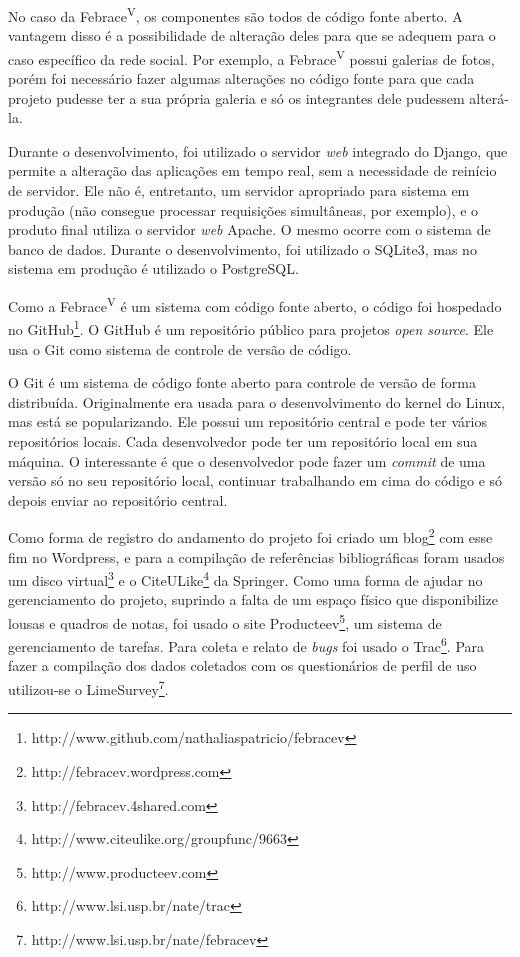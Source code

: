 No caso da Febrace\textsuperscript{V}, os componentes são todos de código fonte aberto. A vantagem disso é a possibilidade de alteração deles para que se adequem para o caso específico da rede social. Por exemplo, a Febrace\textsuperscript{V} possui galerias de fotos, porém foi necessário fazer algumas alterações no código fonte para que cada projeto pudesse ter a sua própria galeria e só os integrantes dele pudessem alterá-la.

Durante o desenvolvimento, foi utilizado o servidor \textit{web} integrado do Django, que permite a alteração das aplicações em tempo real, sem a necessidade de reinício de servidor. Ele não é, entretanto, um servidor apropriado para sistema em produção (não consegue processar requisições simultâneas, por exemplo), e o produto final utiliza o servidor \textit{web} Apache. O mesmo ocorre com o sistema de banco de dados. Durante o desenvolvimento, foi utilizado o SQLite3, mas no sistema em produção é utilizado o PostgreSQL.

Como a Febrace\textsuperscript{V} é um sistema com código fonte aberto, o código foi hospedado no GitHub\footnote{http://www.github.com/nathaliaspatricio/febracev}. O GitHub é um repositório público para projetos \textit{open source}. Ele usa o Git como sistema de controle de versão de código. 

O Git é um sistema de código fonte aberto para controle de versão de forma distribuída. Originalmente era usada para o desenvolvimento do kernel do Linux, mas está se popularizando. Ele possui um repositório central e pode ter vários repositórios locais. Cada desenvolvedor pode ter um repositório local em sua máquina. O interessante é que o desenvolvedor pode fazer um \textit{commit} de uma versão só no seu repositório local, continuar trabalhando em cima do código e só depois enviar ao repositório central.

Como forma de registro do andamento do projeto foi criado um blog\footnote{http://febracev.wordpress.com} com esse fim no Wordpress, e para a compilação de referências bibliográficas foram usados um disco virtual\footnote{http://febracev.4shared.com} e o CiteULike\footnote{http://www.citeulike.org/groupfunc/9663} da Springer. Como uma forma de ajudar no gerenciamento do projeto, suprindo a falta de um espaço físico que disponibilize lousas e quadros de notas, foi usado o site Producteev\footnote{http://www.producteev.com}, um sistema de gerenciamento de tarefas. Para coleta e relato de \textit{bugs} foi usado o Trac\footnote{http://www.lsi.usp.br/nate/trac}. Para fazer a compilação dos dados coletados com os questionários de perfil de uso utilizou-se o LimeSurvey\footnote{http://www.lsi.usp.br/nate/febracev}.


